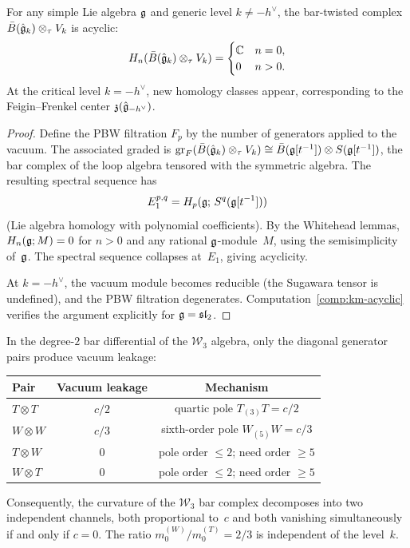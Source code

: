 \begin{proposition}
\label{prop:km-generic-acyclicity}
For any simple Lie algebra $\mathfrak{g}$ and generic level $k \neq -h^\vee$,
the bar-twisted complex $\bar{B}(\hat{\mathfrak{g}}_k) \otimes_\tau V_k$ is acyclic:
\[
H_n(\bar{B}(\hat{\mathfrak{g}}_k) \otimes_\tau V_k) = \begin{cases}
\mathbb{C} & n = 0, \\
0 & n > 0.
\end{cases}
\]
At the critical level $k = -h^\vee$, new homology classes appear,
corresponding to the Feigin--Frenkel center $\mathfrak{z}(\hat{\mathfrak{g}}_{-h^\vee})$.
\end{proposition}

\begin{proof}
Define the PBW filtration $F_p$ by the number of generators applied
to the vacuum.  The associated graded is
$\mathrm{gr}_F(\bar{B}(\hat{\mathfrak{g}}_k) \otimes_\tau V_k) \cong
\bar{B}(\mathfrak{g}[t^{-1}]) \otimes S(\mathfrak{g}[t^{-1}])$,
the bar complex of the loop algebra tensored with the symmetric algebra.
The resulting spectral sequence has
\[
E_1^{p,q} = H_p(\mathfrak{g};\, S^q(\mathfrak{g}[t^{-1}]))
\]
(Lie algebra homology with polynomial coefficients).
By the Whitehead lemmas, $H_n(\mathfrak{g}; M) = 0$ for $n > 0$ and any
rational $\mathfrak{g}$-module~$M$, using the semisimplicity of~$\mathfrak{g}$.
The spectral sequence collapses at~$E_1$, giving acyclicity.

At $k = -h^\vee$, the vacuum module becomes reducible (the Sugawara
tensor is undefined), and the PBW filtration degenerates.
Computation~\ref{comp:km-acyclic} verifies the argument explicitly
for $\mathfrak{g} = \mathfrak{sl}_2$.
\end{proof}


\begin{proposition}
\label{prop:w3-vacuum-dichotomy}
In the degree-$2$ bar differential of the $\mathcal{W}_3$ algebra,
only the diagonal generator pairs produce vacuum leakage:
\begin{center}
\renewcommand{\arraystretch}{1.2}
\begin{tabular}{lcc}
\textbf{Pair} & \textbf{Vacuum leakage} & \textbf{Mechanism} \\
\hline
$T \otimes T$ & $c/2$ & quartic pole $T_{(3)}T = c/2$ \\
$W \otimes W$ & $c/3$ & sixth-order pole $W_{(5)}W = c/3$ \\
$T \otimes W$ & $0$ & pole order $\leq 2$; need order $\geq 5$ \\
$W \otimes T$ & $0$ & pole order $\leq 2$; need order $\geq 5$
\end{tabular}
\end{center}
Consequently, the curvature of the $\mathcal{W}_3$ bar complex decomposes
into two independent channels, both proportional to~$c$ and both vanishing
simultaneously if and only if $c = 0$.
The ratio $m_0^{(W)}/m_0^{(T)} = 2/3$ is independent of the level~$k$.
\end{proposition}

